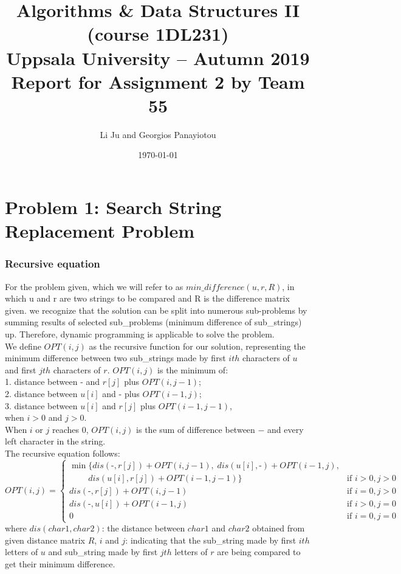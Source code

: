 \documentclass[a4paper,11pt]{article}
\title{\textbf{Algorithms \& Data Structures II (course 1DL231) \\
    Uppsala University -- Autumn 2019 \\
    Report for Assignment 2
    by Team 55}}
\author{Li Ju and Georgios Panayiotou}
\date{\today}
\begin{document}
\maketitle

\part{Problem 1: Search String Replacement Problem}
\section{Recursive equation}

For the problem given, which we will refer to as $min\_difference(u, r, R)$, in which u and r are two strings to be compared and R is the difference matrix given. we recognize that the solution can be split into numerous sub-problems by summing results of selected sub\_problems (minimum difference of sub\_strings) up. Therefore, dynamic programming is applicable to solve the problem.\\

We define $OPT(i,j)$ as the recursive function for our solution, representing the minimum difference between two sub\_strings made by first $ith$ characters of $u$ and first $jth$ characters of $r$. $OPT(i,j)$ is the minimum of: \\1. distance between $\mbox{-}$ and $r[j]$ plus $OPT(i, j-1)$; \\2. distance between $u[i]$ and $\mbox{-}$ plus $OPT(i-1, j)$; \\3. distance between $u[i]$ and $r[j]$ plus $OPT(i-1, j-1)$, \\when $i>0$ and $j>0$. \\When $i$ or $j$ reaches $0$, $OPT(i, j)$ is the sum of difference between $-$ and every left character in the string. \\

The recursive equation follows: 
$$OPT(i,j)=
    \begin{cases}
    \min \{dis(\mbox{-}, r[j])+OPT(i, j-1), \; dis(u[i], \mbox{-})+OPT(i-1, j), \\
    \; \; \; \; \; \; \; \; dis(u[i], r[j])+OPT(i-1, j-1) \} & \text{if~} i>0, j>0\\
    dis(\mbox{-}, r[j])+OPT(i, j-1) & \text{if~} i=0, j>0\\
    dis(\mbox{-}, u[i])+OPT(i-1, j) & \text{if~} i>0, j=0\\
    0 & \text{if~} i=0, j=0
    \end{cases}$$
where $dis(char1, char2)$: the distance between $char1$ and $char2$ obtained from given distance matrix $R$, $i$ and $j$: indicating that the sub\_string made by first $ith$ letters of $u$ and sub\_string made by first $jth$ letters of $r$ are being compared to get their minimum difference.\\
\end{document}
